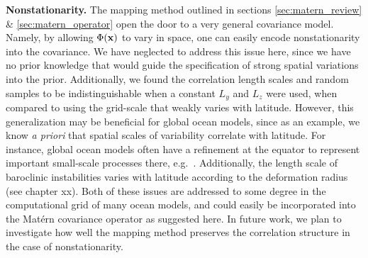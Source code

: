 \noindent\textbf{Nonstationarity.}
The mapping method outlined in
sections \ref{sec:matern_review} \& \ref{sec:matern_operator}
open the door to a very general covariance model.
Namely, by allowing $\Phi(\mathbf{x})$ to vary in space, one can easily encode
nonstationarity into the covariance.
We have neglected to address this issue here, since we have no prior knowledge
that would guide the specification of strong spatial variations into the prior.
Additionally, we found the correlation length scales and random samples to be
indistinguishable when a constant $L_y$ and $L_z$ were used, when compared to
using the grid-scale that weakly varies with latitude.
However, this generalization may be beneficial for global ocean models, since
as an example,
we know \textit{a priori} that spatial scales of variability correlate with
latitude.
For instance, global ocean models often have a refinement at the equator to
represent important small-scale processes there, e.g.\ \citep{forgetECCOv4}.
Additionally, the length scale of baroclinic instabilities varies with latitude
according to the deformation radius (see chapter xx).
Both of these issues are addressed to some degree in the computational grid
of many ocean models, and could easily be incorporated into the Mat\'ern
covariance operator as suggested here.
In future work, we plan to investigate how well the mapping method preserves the
correlation structure in the case of nonstationarity.

